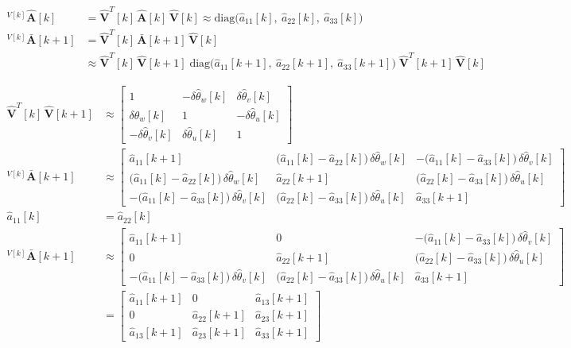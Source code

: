 \documentclass[11pt,a4paper]{ctexart}
\newcommand{\Ab}{\bar{\mathbf A}}
\newcommand{\Ah}{\hat{\mathbf A}}
\newcommand{\Vh}{\hat{\mathbf V}}
\newcommand{\T}{T}
\newcommand{\dth}{\delta\hat\theta}
\begin{document}
\vspace{2.2em}
\begin{align*}
{}^{V[k]}\Ah[k] &= \Vh^{\T}[k]\,\Ah[k]\,\Vh[k] \approx \mathrm{diag}\big(\hat a_{11}[k],\ \hat a_{22}[k],\ \hat a_{33}[k]\big) \\[4pt]
{}^{V[k]}\Ab[k+1] &= \Vh^{\T}[k]\,\Ab[k+1]\,\Vh[k] \\
&\approx \Vh^{\T}[k]\,\Vh[k+1]\;\mathrm{diag}\big(\hat a_{11}[k+1],\ \hat a_{22}[k+1],\ \hat a_{33}[k+1]\big)\;\Vh^{\T}[k+1]\,\Vh[k]
\end{align*}

\vspace{2.2em}
\begin{align*}
\Vh^{\T}[k]\,\Vh[k+1] &\approx \begin{bmatrix}
1 & -\dth_w[k] & \dth_v[k] \\
\dth_w[k] & 1 & -\dth_u[k] \\
-\dth_v[k] & \dth_u[k] & 1
\end{bmatrix} \\[4pt]
{}^{V[k]}\Ab[k+1] &\approx \begin{bmatrix}
\hat a_{11}[k+1] & \big(\hat a_{11}[k] - \hat a_{22}[k]\big)\,\dth_w[k] & -\big(\hat a_{11}[k] - \hat a_{33}[k]\big)\,\dth_v[k] \\
\big(\hat a_{11}[k] - \hat a_{22}[k]\big)\,\dth_w[k] & \hat a_{22}[k+1] & \big(\hat a_{22}[k] - \hat a_{33}[k]\big)\,\dth_u[k] \\
-\big(\hat a_{11}[k] - \hat a_{33}[k]\big)\,\dth_v[k] & \big(\hat a_{22}[k] - \hat a_{33}[k]\big)\,\dth_u[k] & \hat a_{33}[k+1]
\end{bmatrix} \\[4pt]
\hat a_{11}[k] &= \hat a_{22}[k] \\[4pt]
{}^{V[k]}\Ab[k+1] &\approx \begin{bmatrix}
\hat a_{11}[k+1] & 0 & -\big(\hat a_{11}[k] - \hat a_{33}[k]\big)\,\dth_v[k] \\
0 & \hat a_{22}[k+1] & \big(\hat a_{22}[k] - \hat a_{33}[k]\big)\,\dth_u[k] \\
-\big(\hat a_{11}[k] - \hat a_{33}[k]\big)\,\dth_v[k] & \big(\hat a_{22}[k] - \hat a_{33}[k]\big)\,\dth_u[k] & \hat a_{33}[k+1]
\end{bmatrix} \\
&= \begin{bmatrix} \hat a_{11}[k+1] & 0 & \hat a_{13}[k+1] \\ 0 & \hat a_{22}[k+1] & \hat a_{23}[k+1] \\ \hat a_{13}[k+1] & \hat a_{23}[k+1] & \hat a_{33}[k+1] \end{bmatrix}
\end{align*}
\end{document}
